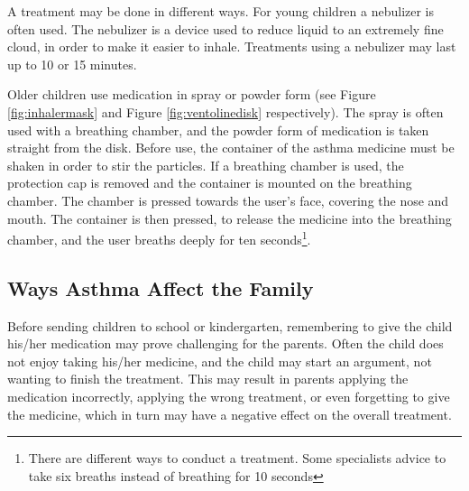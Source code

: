 A treatment may be done in different ways. For young children a nebulizer is often used. The nebulizer is a device used to reduce liquid to an extremely fine cloud, in order to make it easier to inhale. Treatments using a nebulizer may last up to 10 or 15 minutes.

Older children use medication in spray or powder form (see Figure \ref{fig:inhalermask} and Figure \ref{fig:ventolinedisk} respectively). The spray is often used with a breathing chamber, and the powder form of medication is taken straight from the disk. Before use, the container of the asthma medicine must be shaken in order to stir the particles. If a breathing chamber is used, the protection cap is removed and the container is mounted on the breathing chamber. The chamber is pressed towards the user's face, covering the nose and mouth. The container is then pressed, to release the medicine into the breathing chamber, and the user breaths deeply for ten seconds\footnote{There are different ways to conduct a treatment. Some specialists advice to take six breaths instead of breathing for 10 seconds}. 

\subsection{Ways Asthma Affect the Family}
\label{sec:waysasthmaaffectthefamily}
Before sending children to school or kindergarten, remembering to give the child his/her medication may prove challenging for the parents. Often the child does not enjoy taking his/her medicine, and the child may start an argument, not wanting to finish the treatment. This may result in parents applying the medication incorrectly, applying the wrong treatment, or even forgetting to give the medicine, which in turn may have a negative effect on the overall treatment.  

